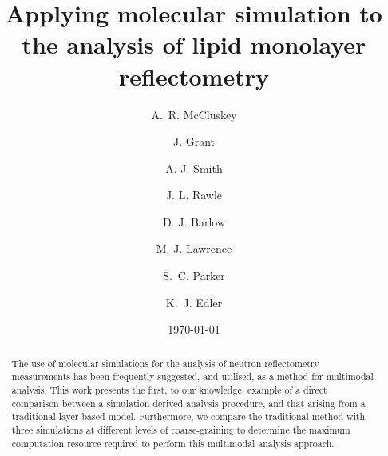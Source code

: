\documentclass[amsmath,amssymb,twocolumn,superscriptaddress,aps,prl]{revtex4-1}
\begin{document}

\title{Applying molecular simulation to the analysis of lipid monolayer reflectometry}

\author{A.~R. McCluskey}

\author{J. Grant}

\author{A. J. Smith}

\author{J. L. Rawle}

\author{D. J. Barlow}

\author{M. J. Lawrence}

\author{S.~C. Parker}

\author{K.~J. Edler}

\date{\today}

\begin{abstract}
The use of molecular simulations for the analysis of neutron reflectometry measurements has been frequently suggested, and utilised, as a method for multimodal analysis. 
This work presents the first, to our knowledge, example of a direct comparison between a simulation derived analysis procedure, and that arising from a traditional layer based model. 
Furthermore, we compare the traditional method with three simulations at different levels of coarse-graining to determine the maximum computation resource required to perform this multimodal analysis approach.
\end{abstract}

\maketitle                        %
\end{document}
